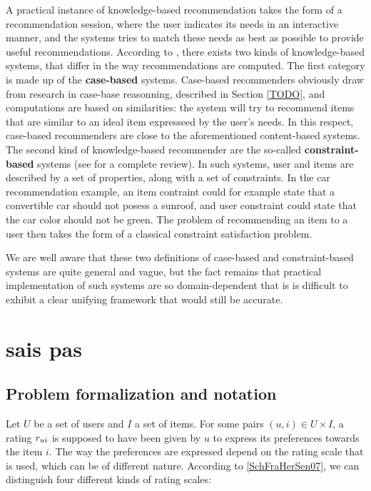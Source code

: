 A practical instance of  knowledge-based recommendation takes the form of a
recommendation session, where the user indicates its needs in an interactive
manner, and the systems tries to match these needs as best as possible to
provide useful recommendations. According to \cite{FelBur08}, there exists two
kinds of knowledge-based systems, that differ in the way recommendations are
computed. The first category is made up of the \textbf{case-based} systems.
Case-based recommenders obviously draw from research in case-base reasonning,
described in Section \ref{TODO}, and computations are based on similarities:
the system will try to recommend items that are similar to an ideal item
expresseed by the user's needs. In
this respect, case-based recommenders are close to the aforementioned
content-based systems. The second  kind of knowledge-based recommender are the
so-called \textbf{constraint-based} systems (see \cite{FelFriJanZan11} for a complete
review). In such systems, user and items are described
by a set of properties, along with a set of constraints. In the car
recommendation example, an item contraint could for example state that a
convertible car should not posess a sunroof, and user constraint could state
that the car color should not be green. The problem of recommending an item to
a user then takes the form of a classical constraint satisfaction
problem.

We are well aware that these two definitions of case-based and constraint-based
systems are quite general and vague, but the fact remains that practical
implementation of such systems are so domain-dependent that is is difficult to
exhibit a clear unifying framework that would still be accurate.

\section{sais pas}
\label{SEC:saispas}
\subsection{Problem formalization and notation}
Let $U$ be a set of users and $I$ a set of items. For some pairs $(u,i) \in U
\times I$, a rating  $r_{ui}$ is supposed to have been given by $u$ to express
its preferences towards the item $i$. The way the preferences are expressed
depend on the rating scale that is used, which can be of different nature.
According to \ref{SchFraHerSen07}, we can distinguish four different kinds of
rating scales:

